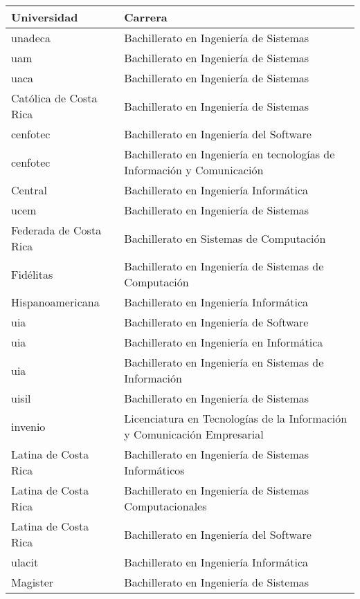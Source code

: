 \begin{table}[h!]
    \footnotesize
    \begin{tabular}{ll}
        \toprule[1.5pt]
        \textbf{Universidad} & \textbf{Carrera}\\
        \midrule
        \gls{unadeca} & Bachillerato en Ingeniería de Sistemas \\
        \gls{uam} & Bachillerato en Ingeniería de Sistemas \\
        \gls{uaca} &	Bachillerato en Ingeniería de Sistemas \\
        Católica de Costa Rica & 	Bachillerato en Ingeniería de Sistemas \\
        \gls{cenfotec}	& Bachillerato en Ingeniería del Software \\
        \gls{cenfotec} & Bachillerato en Ingeniería en tecnologías de Información y Comunicación \\
        Central &  Bachillerato en Ingeniería Informática \\ 
        \gls{ucem} & Bachillerato en Ingeniería de Sistemas \\
        Federada de Costa Rica & Bachillerato en Sistemas de Computación \\
        Fidélitas & Bachillerato en Ingeniería de Sistemas de Computación \\
        Hispanoamericana &	Bachillerato en Ingeniería Informática \\
        \gls{uia} &	Bachillerato en Ingeniería de Software \\
        \gls{uia} &	Bachillerato en Ingeniería en Informática \\
        \gls{uia} &	Bachillerato en Ingeniería en Sistemas de Información \\
        \gls{uisil} &	Bachillerato en Ingeniería de Sistemas \\
        \gls{invenio} & Licenciatura en Tecnologías de la Información y Comunicación Empresarial \\
        Latina de Costa Rica & Bachillerato en Ingeniería de Sistemas Informáticos \\
        Latina de Costa Rica & Bachillerato en Ingeniería de Sistemas Computacionales \\
        Latina de Costa Rica & Bachillerato en Ingeniería del Software \\
        \gls{ulacit} & Bachillerato en Ingeniería Informática \\
        Magister & Bachillerato en Ingeniería de Sistemas \\

\end{tabular}
\end{table}
